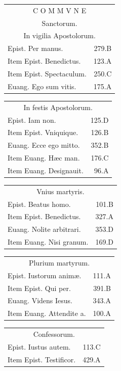 \documentclass[a5paper,10pt]{book}
\def\ae{æ}
\begin{document}
\begin{multicols}{2}
\begin{tabular}{l r}
\end{tabular}
\begin{tabular}{l r}
\multicolumn{2}{c}{\color{red} \large C O M M V N E}\\
\multicolumn{2}{c}{\color{red} Sanctorum.}\\
\multicolumn{2}{c}{\color{red} In vigilia Apostolorum.}\\
Epist. Per manus. & 279.B\\
Item Epist. Benedictus. & 123.A\\
Item Epist. Spectaculum. & 250.C\\
Euang. Ego sum vitis. & 175.A\\
\end{tabular}
\begin{tabular}{l r}
\multicolumn{2}{c}{\color{red} In festis Apostolorum.}\\
Epist. Iam non. & 125.D\\
Item Epist. Vniquique. & 126.B\\
Euang. Ecce ego mitto. & 352.B\\
Item Euang. H\ae c man. & 176.C\\
Item Euang. Designauit. & 96.A\\
\end{tabular}
\begin{tabular}{l r}
\multicolumn{2}{c}{\color{red} Vnius martyris.}\\
Epist. Beatus homo. & 101.B\\
Item Epist. Benedictus. & 327.A\\
Euang. Nolite arbitrari. & 353.D\\
Item Euang. Nisi granum. & 169.D\\
\end{tabular}
\begin{tabular}{l r}
\multicolumn{2}{c}{\color{red} Plurium martyrum.}\\
Epist. Iustorum anim\ae . & 111.A\\
Item Epist. Qui per. & 391.B\\
Euang. Videns Iesus. & 343.A\\
Item Euang. Attendite a. & 100.A\\
\end{tabular}
\begin{tabular}{l r}
\multicolumn{2}{c}{\color{red} Confessorum.}\\
Epist. Iustus autem. & 113.C\\
Item Epist. Testificor. & 429.A\\

\end{tabular}
\end{multicols}
\end{document}
